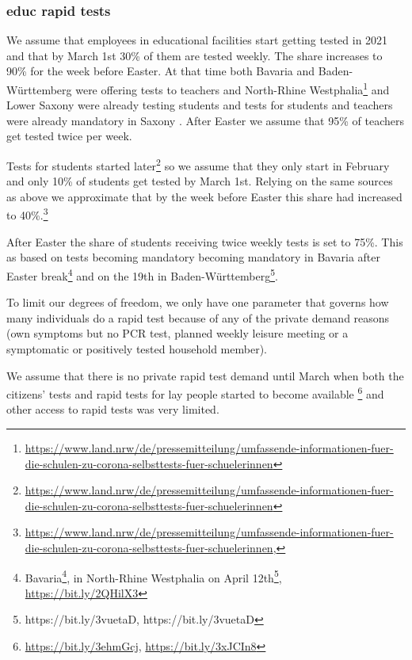 \subsubsection{educ rapid tests}

We assume that employees in educational facilities start getting tested in 2021 and that
by March 1st 30\% of them are tested weekly. The share increases to 90\% for the week
before Easter. At that time both Bavaria \citep{BayrischerRundfunk2021} and
Baden-Württemberg \citep{MinisteriumKultus2021} were offering tests to teachers and
North-Rhine
Westphalia\footnote{\url{https://www.land.nrw/de/pressemitteilung/umfassende-informationen-fuer-die-schulen-zu-corona-selbsttests-fuer-schuelerinnen}}
\cite{DPA2021} and Lower Saxony \citep{SueddeutscheZeitung2021} were already testing
students and tests for students and teachers were already mandatory in Saxony
\citep{SueddeutscheZeitung2021a}. After Easter we assume that 95\% of teachers get tested
twice per week.

Tests for students started
later\footnote{\url{https://www.land.nrw/de/pressemitteilung/umfassende-informationen-fuer-die-schulen-zu-corona-selbsttests-fuer-schuelerinnen}}
\citep{MinisteriumKultus2021} so we assume that they only start in February and only 10\%
of students get tested by March 1st. Relying on the same sources as above we approximate
that by the week before Easter this share had increased to 40\%.\footnote{\url{https://www.land.nrw/de/pressemitteilung/umfassende-informationen-fuer-die-schulen-zu-corona-selbsttests-fuer-schuelerinnen}, }

After Easter the share of students receiving twice weekly tests is set to 75\%. This as
based on tests becoming mandatory becoming mandatory in Bavaria after Easter
break\footnote{Bavaria\footnote{\url{https://bit.ly/3nz5fXS}}, in North-Rhine Westphalia
on April
12th\footnote{https://www.schulministerium.nrw/ministerium/schulverwaltung/schulmail-archiv/14042021-schulbetrieb-im-wechselunterricht-ab-montag},
\url{https://bit.ly/2QHilX3}} and on the 19th in
Baden-Württemberg\footnote{https://bit.ly/3vuetaD, https://bit.ly/3vuetaD}.


To limit our degrees of freedom, we only have one parameter that governs how many
individuals do a rapid test because of any of the private demand reasons (own symptoms
but no PCR test, planned weekly leisure meeting or a symptomatic or positively tested
household member).

We assume that there is no private rapid test demand until March when both the citizens'
tests and rapid tests for lay people started to become available
\footnote{\url{https://bit.ly/3ehmGcj}, \url{https://bit.ly/3xJCIn8}} and other access to
rapid tests was very limited.

